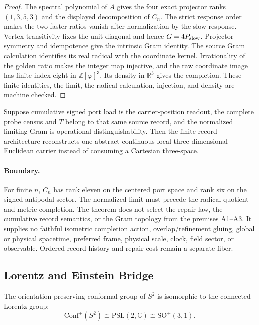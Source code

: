 \begin{proof}
The spectral polynomial of \(A\) gives the four exact projector ranks
\((1,3,5,3)\) and the displayed decomposition of \(C_n\). The strict response
order makes the two faster ratios vanish after normalization by the slow
response. Vertex transitivity fixes the unit diagonal and hence
\(G=4P_{\rm slow}\). Projector symmetry and idempotence give the intrinsic
Gram identity. The source Gram calculation identifies its real radical with
the coordinate kernel. Irrationality of the golden ratio makes the integer
map injective, and the raw coordinate image has finite index eight in
\(\mathbb Z[\varphi]^3\). Its density in \(\mathbb R^3\) gives the completion.
These finite identities, the limit, the radical calculation, injection, and
density are machine checked.
\end{proof}

\begin{corollary}
Suppose cumulative signed port load is the carrier-position readout, the
complete probe census and \(T\) belong to that same source record, and the
normalized limiting Gram is operational distinguishability. Then the finite
record architecture reconstructs one abstract continuous local
three-dimensional Euclidean carrier instead of consuming a Cartesian
three-space.
\end{corollary}

\paragraph{Boundary.}
For finite \(n\), \(C_n\) has rank eleven on the centered port space and rank
six on the signed antipodal sector. The normalized limit must precede the
radical quotient and metric completion. The theorem does not select the
repair law, the cumulative record semantics, or the Gram topology from the
premises A1--A3. It supplies no faithful isometric completion action,
overlap/refinement gluing, global or physical spacetime, preferred frame,
physical scale, clock, field sector, or observable. Ordered record history
and repair cost remain a separate fiber.

\subsection{Lorentz and Einstein Bridge}

\begin{theorem}
The orientation-preserving conformal group of \(S^2\) is isomorphic to the connected Lorentz
group:
\[
\mathrm{Conf}^+(S^2)\cong \mathrm{PSL}(2,\mathbb C)\cong \mathrm{SO}^+(3,1).
\]
\end{theorem}

